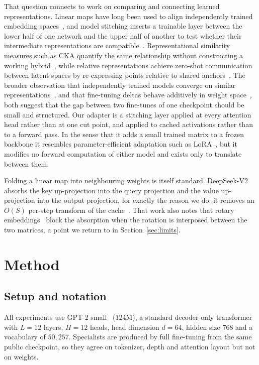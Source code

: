 \documentclass[11pt]{article}
\begin{document}
That question connects to work on comparing and connecting learned representations. Linear
maps have long been used to align independently trained embedding spaces~\cite{
mikolov2013exploiting}, and model stitching inserts a trainable layer between the lower
half of one network and the upper half of another to test whether their intermediate
representations are compatible~\cite{lenc2015understanding, bansal2021stitching}.
Representational similarity measures such as CKA quantify the same relationship without
constructing a working hybrid~\cite{kornblith2019cka}, while relative representations
achieve zero-shot communication between latent spaces by re-expressing points relative to
shared anchors~\cite{moschella2023relative}. The broader observation that independently
trained models converge on similar representations~\cite{huh2024platonic}, and that
fine-tuning deltas behave additively in weight space~\cite{ilharco2023task}, both suggest
that the gap between two fine-tunes of one checkpoint should be small and structured. Our
adapter is a stitching layer applied at every attention head rather than at one cut point,
and applied to cached activations rather than to a forward pass. In the sense that it adds a
small trained matrix to a frozen backbone it resembles parameter-efficient adaptation such as
LoRA~\cite{hu2022lora}, but it modifies no forward computation of either model and exists
only to translate between them.

Folding a linear map into neighbouring weights is itself standard. DeepSeek-V2 absorbs the
key up-projection into the query projection and the value up-projection into the output
projection, for exactly the reason we do: it removes an $O(S)$ per-step transform of the
cache~\cite{deepseekv2}. That work also notes that rotary embeddings~\cite{su2024roformer}
block the absorption when the rotation is interposed between the two matrices, a point we
return to in Section~\ref{sec:limits}.

\section{Method}

\subsection{Setup and notation}

All experiments use GPT-2 small~\cite{radford2019gpt2} (124M), a standard decoder-only
transformer~\cite{vaswani2017attention} with $L = 12$ layers, $H = 12$ heads, head dimension
$d = 64$, hidden size $768$ and a vocabulary of $50{,}257$. Specialists are produced by full
fine-tuning from the same public checkpoint, so they agree on tokenizer, depth and attention
layout but not on weights.
\end{document}

